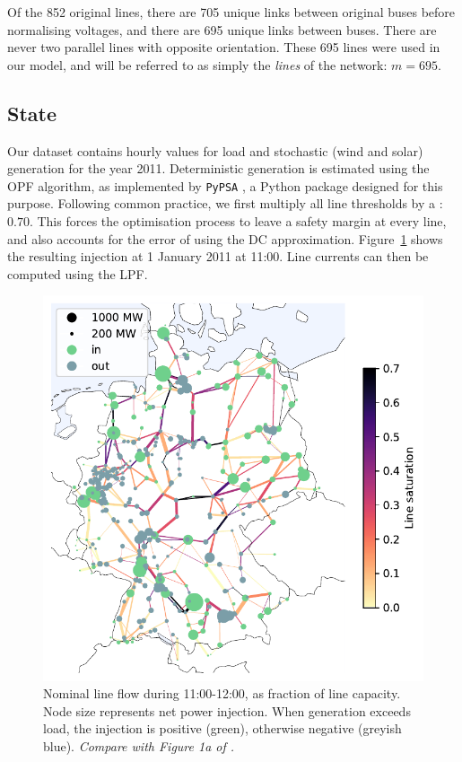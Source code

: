 \documentclass[main.tex]{subfiles}
\begin{document}
Of the 852 original lines, there are 705 unique links between original buses before normalising voltages, and there are 695 unique links between buses. There are never two parallel lines with opposite orientation. These 695 lines were used in our model, and will be referred to as simply the \emph{lines} of the network: $m = 695$.

\subsection{State}
Our dataset contains hourly values for load and stochastic (wind and solar) generation for the year 2011. Deterministic generation is estimated using the OPF algorithm, as implemented by \texttt{PyPSA} \citep{PyPSA}, a Python package designed for this purpose. Following common practice, we first multiply all line thresholds by a : $0.70$. This forces the optimisation process to leave a safety margin at every line, and also accounts for the error of using the DC approximation. Figure~\ref{fig:nominalflowandinjection} shows the resulting injection at 1 January 2011 at 11:00. Line currents can then be computed using the LPF.

\begin{figure}[ht]
    \centering
    \includegraphics[width=.6\textwidth]{img/nominal_flow_and_injection.pdf}
    \caption{
    \label{fig:nominalflowandinjection}Nominal line flow during 11:00-12:00, as fraction of line capacity. Node size represents net power injection. When generation exceeds load, the injection is positive (green), otherwise negative (greyish blue). \emph{Compare with Figure 1a of \cite{Nesti2018emergentfailures}.}}
\end{figure}
\end{document}
